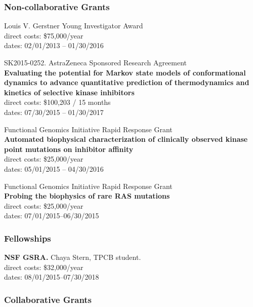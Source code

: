 \documentclass[10pt]{article}
\begin{document}
\subsubsection*{Non-collaborative Grants}

Louis V. Gerstner Young Investigator Award\\
direct costs: \$75,000/year\\
dates: 02/01/2013 -- 01/30/2016

\vspace{2ex}

SK2015-0252. AstraZeneca Sponsored Research Agreement\\
{\bf Evaluating the potential for Markov state models of conformational dynamics to advance quantitative prediction of thermodynamics and kinetics of selective kinase inhibitors}\\
direct costs: \$100,203 / 15 months\\
dates: 07/30/2015 -- 01/30/2017

\vspace{2ex}

Functional Genomics Initiative Rapid Response Grant\\
{\bf Automated biophysical characterization of clinically observed kinase point mutations on inhibitor affinity}\\
direct costs: \$25,000/year\\
dates: 05/01/2015 -- 04/30/2016

\vspace{2ex}

Functional Genomics Initiative Rapid Response Grant\\
{\bf Probing the biophysics of rare RAS mutations}\\
direct costs: \$25,000/year\\
dates: 07/01/2015--06/30/2015

\subsubsection*{Fellowships}

{\bf NSF GSRA.}  Chaya Stern, TPCB student.\\
direct costs: \$32,000/year\\
dates: 08/01/2015--07/30/2018

\subsubsection*{Collaborative Grants}
\end{document}
